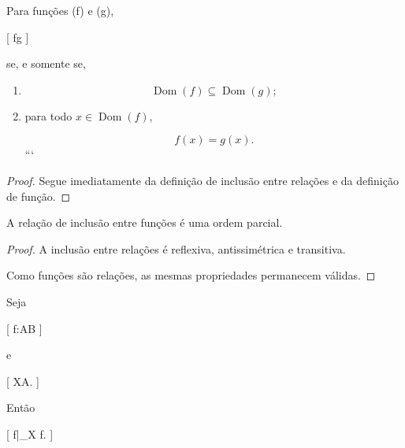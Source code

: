 \begin{prop}
	\label{prop:matematica:funcoes:restricoes-e-extensoes:inclusao-caracterizacao}

	Para funções (f) e (g),

	[
			f\subseteq g
		]

	se, e somente se,

	\begin{enumerate}

		```
		\item
		      \[
			      \operatorname{Dom}(f)
			      \subseteq
			      \operatorname{Dom}(g);
		      \]

		\item para todo
		      \(x\in\operatorname{Dom}(f)\),

		      \[
			      f(x)=g(x).
		      \]
		      ```

	\end{enumerate}

\end{prop}

\begin{proof}

	Segue imediatamente da definição de inclusão entre relações e da
	definição de função.

\end{proof}

\begin{prop}
	\label{prop:matematica:funcoes:restricoes-e-extensoes:ordem-parcial}

	A relação de inclusão entre funções é uma ordem parcial.

\end{prop}

\begin{proof}

	A inclusão entre relações é reflexiva, antissimétrica e transitiva.

	Como funções são relações, as mesmas propriedades permanecem válidas.

\end{proof}

\begin{prop}
	\label{prop:matematica:funcoes:restricoes-e-extensoes:restricao-inclusao}

	Seja

		[
			f:A\to B
		]

	e

		[
			X\subseteq A.
		]

	Então

	[
	f|_X
	\subseteq
	f.
	]

\end{prop}

